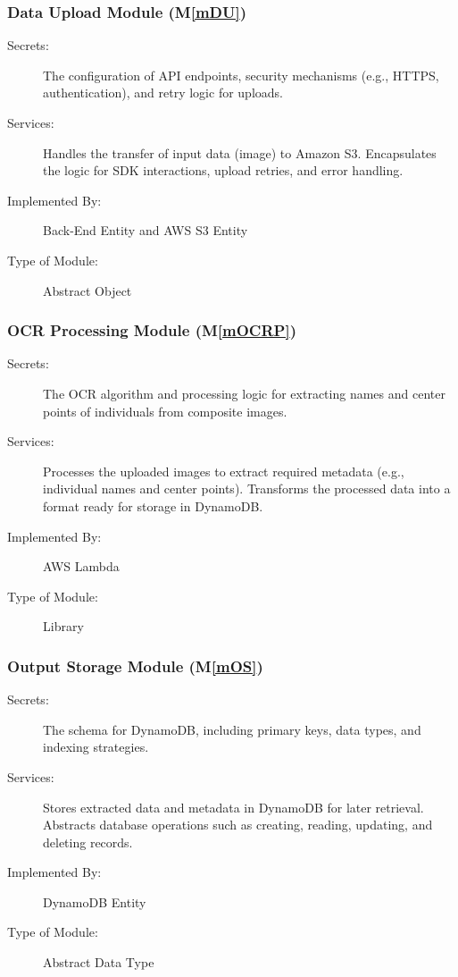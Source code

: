 \documentclass[12pt, titlepage]{article}
\newcommand{\mref}[1]{M\ref{#1}}
\begin{document}
\subsubsection{Data Upload Module (\mref{mDU})}

\begin{description}
\item[Secrets:]The configuration of API endpoints, security mechanisms (e.g., HTTPS, authentication), and retry logic for uploads.
\item[Services:]Handles the transfer of input data (image) to Amazon S3. Encapsulates the logic for SDK interactions, upload retries, and error handling.
\item[Implemented By:] Back-End Entity and AWS S3 Entity
\item[Type of Module:] Abstract Object
\end{description}

\subsubsection{OCR Processing Module (\mref{mOCRP})}

\begin{description}
\item[Secrets:]The OCR algorithm and processing logic for extracting names and center points of individuals from composite images.
\item[Services:]Processes the uploaded images to extract required metadata (e.g., individual names and center points). Transforms the processed data into a format ready for storage in DynamoDB.
\item[Implemented By:] AWS Lambda
\item[Type of Module:] Library
\end{description}

\subsubsection{Output Storage Module (\mref{mOS})}

\begin{description}
\item[Secrets:]The schema for DynamoDB, including primary keys, data types, and indexing strategies.
\item[Services:]Stores extracted data and metadata in DynamoDB for later retrieval. Abstracts database operations such as creating, reading, updating, and deleting records.
\item[Implemented By:] DynamoDB Entity
\item[Type of Module:] Abstract Data Type
\end{description}
\end{document}
